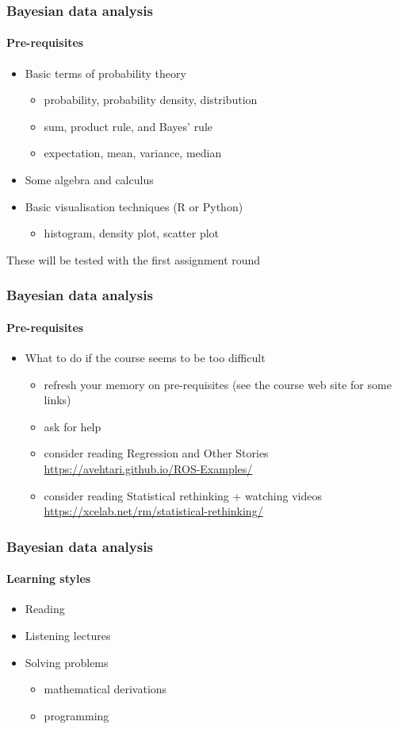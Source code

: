 \documentclass[english]{beamer}
\begin{document}
\begin{frame}
  \frametitle{Bayesian data analysis}  %
  \framesubtitle{Pre-requisites}
  \begin{itemize}
  \item Basic terms of probability theory
    \begin{itemize}
    \item probability, probability density, distribution
    \item sum, product rule, and Bayes' rule
    \item expectation, mean, variance, median
    \end{itemize}
  \item Some algebra and calculus
  \item Basic visualisation techniques (R or Python)
    \begin{itemize}
    \item histogram, density plot, scatter plot
    \end{itemize}
  \end{itemize}

  These will be tested with the first assignment round

\end{frame}

\begin{frame}
  \frametitle{Bayesian data analysis}  %
  \framesubtitle{Pre-requisites}
  \begin{itemize}
  \item What to do if the course seems to be too difficult
    \begin{itemize}
    \item refresh your memory on pre-requisites (see the course web
      site for some links)
    \item ask for help
    \item consider reading Regression and Other Stories \url{https://avehtari.github.io/ROS-Examples/}
    \item consider reading Statistical rethinking + watching videos \url{https://xcelab.net/rm/statistical-rethinking/}
    \end{itemize}
  \end{itemize}

\end{frame}


\begin{frame}
  \frametitle{Bayesian data analysis}  %
  \framesubtitle{Learning styles}

  \begin{itemize}
  \item Reading
  \item Listening lectures
  \item Solving problems
    \begin{itemize}
    \item mathematical derivations
    \item programming
    \end{itemize}
  \end{itemize}
  
\end{frame}
\end{document}
